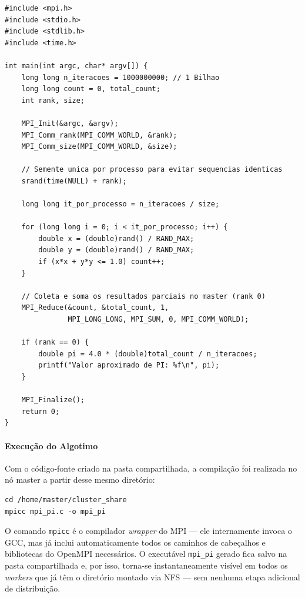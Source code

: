 \documentclass[
	12pt,
	oneside,
	a4paper,
	chapter=TITLE,
	section=TITLE,
	english,
	brazil,
	sumario=tradicional
]{abntex2}
\begin{document}
\begin{lstlisting}[style=c, caption={Código-fonte do algoritmo de Monte Carlo paralelizado com MPI (\texttt{mpi\_pi.c}).}]
#include <mpi.h>
#include <stdio.h>
#include <stdlib.h>
#include <time.h>
 
int main(int argc, char* argv[]) {
    long long n_iteracoes = 1000000000; // 1 Bilhao
    long long count = 0, total_count;
    int rank, size;
 
    MPI_Init(&argc, &argv);
    MPI_Comm_rank(MPI_COMM_WORLD, &rank);
    MPI_Comm_size(MPI_COMM_WORLD, &size);
 
    // Semente unica por processo para evitar sequencias identicas
    srand(time(NULL) + rank);
 
    long long it_por_processo = n_iteracoes / size;
 
    for (long long i = 0; i < it_por_processo; i++) {
        double x = (double)rand() / RAND_MAX;
        double y = (double)rand() / RAND_MAX;
        if (x*x + y*y <= 1.0) count++;
    }
 
    // Coleta e soma os resultados parciais no master (rank 0)
    MPI_Reduce(&count, &total_count, 1,
               MPI_LONG_LONG, MPI_SUM, 0, MPI_COMM_WORLD);
 
    if (rank == 0) {
        double pi = 4.0 * (double)total_count / n_iteracoes;
        printf("Valor aproximado de PI: %f\n", pi);
    }
 
    MPI_Finalize();
    return 0;
}
\end{lstlisting}

\paragraph{Execução do Algotimo}

Com o código-fonte criado na pasta compartilhada, a compilação
foi realizada no nó master a partir desse mesmo diretório:
 
\begin{lstlisting}[style=bash, caption={Acesso à pasta compartilhada e compilação do código.}]
cd /home/master/cluster_share
mpicc mpi_pi.c -o mpi_pi
\end{lstlisting}
 
O comando \texttt{mpicc} é o compilador \textit{wrapper} do MPI
— ele internamente invoca o GCC, mas já inclui automaticamente
todos os caminhos de cabeçalhos e bibliotecas do OpenMPI
necessários. O executável \texttt{mpi\_pi} gerado fica salvo
na pasta compartilhada e, por isso, torna-se instantaneamente
visível em todos os \textit{workers} que já têm o diretório
montado via NFS — sem nenhuma etapa adicional de distribuição.
\end{document}
